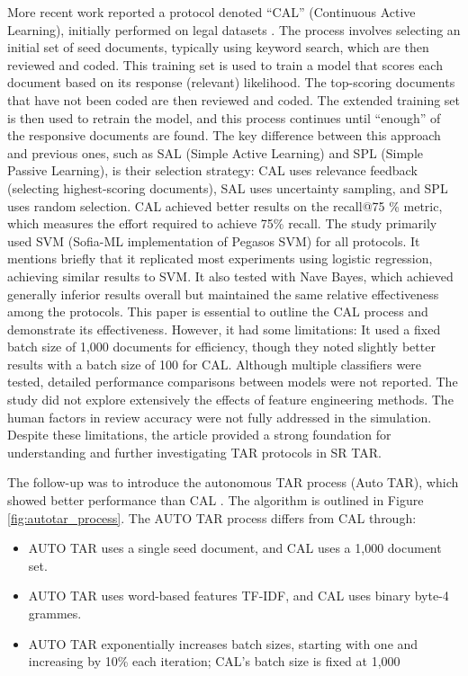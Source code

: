\documentclass[10pt, english]{article}
\begin{document}
More recent work reported a protocol denoted ``CAL'' (Continuous Active Learning), initially performed on legal datasets \cite{cormack_evaluationsections//_2014}. The process involves selecting an initial set of seed documents, typically using keyword search, which are then reviewed and coded. This training set is used to train a model that scores each document based on its response (relevant) likelihood. The top-scoring documents that have not been coded are then reviewed and coded. The extended training set is then used to retrain the model, and this process continues until ``enough'' of the responsive documents are found.
The key difference between this approach and previous ones, such as SAL (Simple Active Learning) and SPL (Simple Passive Learning), is their selection strategy: CAL uses relevance feedback (selecting highest-scoring documents), SAL uses uncertainty sampling, and SPL uses random selection. CAL achieved better results on the recall@75 \% metric, which measures the effort required to achieve 75\% recall.
The study primarily used SVM (Sofia-ML implementation of Pegasos SVM) for all protocols. It mentions briefly that it replicated most experiments using logistic regression, achieving similar results to SVM. It also tested with Nave Bayes, which achieved generally inferior results overall but maintained the same relative effectiveness among the protocols.
This paper is essential to outline the CAL process and demonstrate its effectiveness. However, it had some limitations: It used a fixed batch size of 1,000 documents for efficiency, though they noted slightly better results with a batch size of 100 for CAL. Although multiple classifiers were tested, detailed performance comparisons between models were not reported. The study did not explore extensively the effects of feature engineering methods. The human factors in review accuracy were not fully addressed in the simulation. Despite these limitations, the article provided a strong foundation for understanding and further investigating TAR protocols in SR TAR.

The follow-up was to introduce the autonomous TAR process (Auto TAR), which showed better performance than CAL \cite{cormack_autonomy_2015}. The algorithm is outlined in Figure \ref{fig:autotar_process}. 
The AUTO TAR process differs from CAL through:
\begin{itemize}
    \item AUTO TAR uses a single seed document, and CAL uses a 1,000 document set.
    \item AUTO TAR uses word-based features TF-IDF, and CAL uses binary byte-4 grammes.
    \item AUTO TAR exponentially increases batch sizes, starting with one and increasing by 10\% each iteration; CAL's batch size is fixed at 1,000
\end{itemize}
\end{document}
